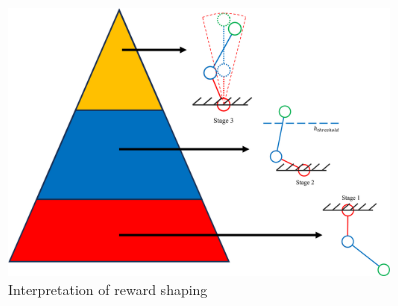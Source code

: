 \begin{figure}[htbp]
    \centering
    \includegraphics[width=0.9\textwidth]{figures/reward_explained.png} %
    \caption{Interpretation of reward shaping}
    \label{fig:example}
\end{figure}

\cleardoublepage
